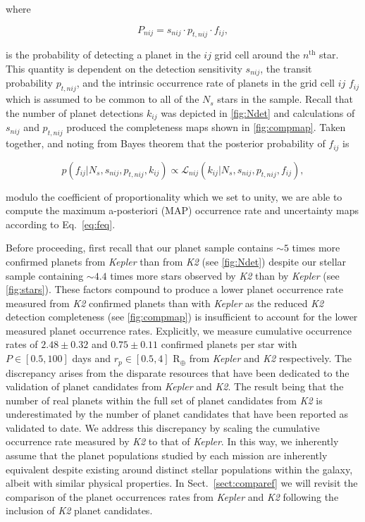 \documentclass[twocolumn]{emulateapj}
\newcommand{\kepler}[1]{\emph{Kepler}#1}
\newcommand{\ktwo}[1]{\emph{K2}#1}
\begin{document}
\noindent where

\begin{equation}
  P_{nij} = s_{nij} \cdot p_{t,nij} \cdot f_{ij},
  \label{eq:prob}
\end{equation}

\noindent is the probability of detecting a planet in the $ij$ grid cell around the $n^{\text{th}}$ star.
This quantity is dependent on the detection sensitivity $s_{nij}$, the transit probability $p_{t,nij}$, and the 
intrinsic occurrence rate of planets in the grid cell $ij$ $f_{ij}$ which is assumed to be common to all
of the $N_s$ stars in the sample.
Recall that the number of planet detections $k_{ij}$ was depicted in \autoref{fig:Ndet} and
calculations of $s_{nij}$ and $p_{t,nij}$ produced the completeness maps shown in \autoref{fig:compmap}. 
Taken together, and noting from Bayes theorem that the posterior probability of $f_{ij}$ is 

\begin{equation}
  p(f_{ij}|N_s,s_{nij},p_{t,nij},k_{ij}) \propto \mathcal{L}_{nij}(k_{ij}|N_s,s_{nij},p_{t,nij},f_{ij}),
  \label{eq:feq}
\end{equation}
  
\noindent modulo the coefficient of proportionality which we set to unity, we are able to compute
the maximum a-posteriori (MAP) occurrence rate and uncertainty maps according to Eq.~\ref{eq:feq}.

Before proceeding, first recall that our planet sample contains $\sim 5$ times more confirmed planets
from \kepler{} than from \ktwo{}
(see \autoref{fig:Ndet}) despite our stellar sample containing $\sim 4.4$ times more stars observed by
\ktwo{} than by \kepler{} 
(see \autoref{fig:stars}). These factors compound to produce a lower planet occurrence rate measured
from \ktwo{} confirmed planets than with \kepler{} as the reduced \ktwo{} detection completeness
(see \autoref{fig:compmap}) is insufficient to account for the lower measured
planet occurrence rates. Explicitly, we measure cumulative occurrence rates of
$2.48\pm 0.32$ and $0.75\pm 0.11$ confirmed planets per star with $P\in [0.5,100]$ days
and $r_p\in [0.5,4]$ R$_{\oplus}$ from \kepler{} and \ktwo{} respectively.
The discrepancy arises from the disparate resources that have
been dedicated to the validation of planet candidates from \kepler{} and \ktwo{.} The result being that
the number of real planets within the full set of planet candidates from \ktwo{} is underestimated
by the number of planet candidates that have been reported as validated to date. We address this discrepancy
by scaling the cumulative occurrence rate measured by \ktwo{} to that of \kepler{.}
In this way, we inherently assume that the planet populations studied by each mission are inherently
equivalent despite existing around distinct stellar populations within the galaxy, albeit with similar
physical properties. In Sect.~\ref{sect:comparef} we will revisit the comparison of the planet occurrences
rates from \kepler{} and \ktwo{} following the inclusion of \ktwo{} planet candidates.
\end{document}
